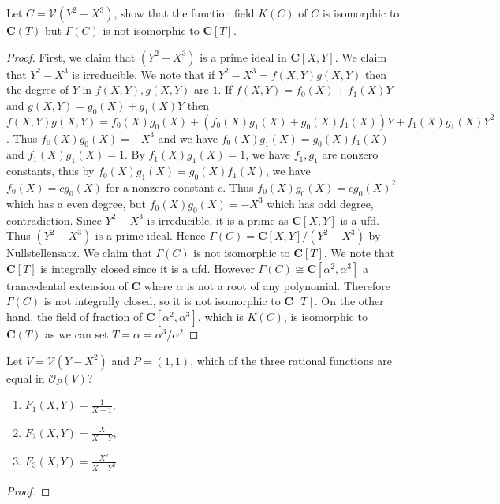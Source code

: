 \documentclass[11pt]{book}
\begin{document}
\begin{problem}Let $C=\mathcal{V}(Y^2-X^3)$, show that the function field $K(C)$ of $C$ is isomorphic to $\mathbf C(T)$ but $\Gamma(C)$ is not isomorphic to $\mathbf C[T]$.
\begin{proof}
First, we claim that $(Y^2-X^3)$ is a prime ideal in $\mathbf C[X,Y]$. We claim that $Y^2-X^3$ is irreducible. We note that if $Y^2-X^3=f(X,Y)g(X,Y)$ then the degree of $Y$ in $f(X,Y),g(X,Y)$ are $1$. If $f(X,Y)=f_0(X)+f_1(X)Y$ and $g(X,Y)=g_0(X)+g_1(X)Y$ then $f(X,Y)g(X,Y)=f_0(X)g_0(X)+(f_0(X)g_1(X)+g_0(X)f_1(X))Y+f_1(X)g_1(X)Y^2$. Thus $f_0(X)g_0(X)=-X^3$ and we have $f_0(X)g_1(X)=g_0(X)f_1(X)$ and $f_1(X)g_1(X)=1$. By $f_1(X)g_1(X)=1$, we have $f_1,g_1$ are nonzero constants, thus by $f_0(X)g_1(X)=g_0(X)f_1(X)$, we have $f_0(X)=cg_0(X)$ for a nonzero constant $c$. Thus $f_0(X)g_0(X)=cg_0(X)^2$ which has a even degree, but $f_0(X)g_0(X)=-X^3$ which has odd degree, contradiction. Since $Y^2-X^3$ is irreducible, it is a prime as $\mathbf C[X,Y]$ is a ufd. Thus $(Y^2-X^3)$ is a prime ideal. Hence $\Gamma(C)=\mathbf C[X,Y]/(Y^2-X^3)$ by Nullstellensatz. We claim that $\Gamma(C)$ is not isomorphic to $\mathbf C[T]$. We note that $\mathbf C[T]$ is integrally closed since it is a ufd. However $\Gamma(C)\cong \mathbf C[\alpha^2,\alpha^3]$ a trancedental extension of $\mathbf C$ where $\alpha$ is not a root of any polynomial. Therefore $\Gamma(C)$ is not integrally closed, so it is not isomorphic to $\mathbf C[T]$. On the other hand, the field of fraction of $\mathbf C[\alpha^2,\alpha^3]$, which is $K(C)$, is isomorphic to $\mathbf C(T)$ as we can set $T=\alpha=\alpha^3/\alpha^2$
\end{proof}
\end{problem}
\begin{problem}Let $V=\mathcal{V}(Y-X^2)$ and $P=(1,1)$, which of the three rational functions are equal in $\mathcal{O}_P(V)$?
\begin{enumerate}
	\item $F_1(X,Y)=\frac{1}{X+1}$,
	\item $F_2(X,Y)=\frac{X}{X+Y}$,
	\item $F_3(X,Y)=\frac{X^2}{X+Y^2}$.
\end{enumerate}
\begin{proof}

\end{proof}
\end{problem}
\end{document}
